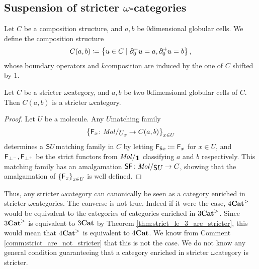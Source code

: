 \subsection{Suspension of stricter \texorpdfstring{$\omega$}{ω}-categories} \label{subsec:suspension}

\begin{dfn} 
    Let \( C \) be a composition structure, and \( a, b \) be \( 0 \)\nbd dimensional globular cells.
    We define the composition structure
    \begin{equation*}
        C(a, b) \coloneqq \left\{ {u \in C \mid \partial_{0}^{-} u = a, \partial_{0}^{+} u = b} \right\},    
    \end{equation*}
    whose boundary operators and \( k \)\nbd composition are induced by the one of \( C \) shifted by \( 1 \).
\end{dfn}

\begin{lem} \label{lem:hom_of_stricter_is_stricter}
    Let \( C \) be a stricter \( \omega \)\nbd category, and \( a, b \) be two \( 0 \)\nbd dimensional globular cells of \( C \).
    Then \( C(a, b) \) is a stricter \( \omega \)\nbd category.
\end{lem}
\begin{proof}
    Let \( U \) be a molecule.
    Any \( U \)\nbd matching family 
    \begin{equation*}
        \set{\F_x \colon \molecin{\imel{U}{x}} \to C(a, b)}_{x \in U}
    \end{equation*}
    determines a \( \mathsf{S}{U} \)\nbd matching family in \( C \) by letting \( \mathsf{F}_{\mathsf{S}{x}} \coloneqq \mathsf{F}_x \) for \( x \in U \), and \( \mathsf{F}_{\bot^-}, \mathsf{F}_{\bot^+} \) be the strict functors from \( \molecin{\pt} \) classifying \( a \) and \( b \) respectively. 
    This matching family has an amalgamation \( \sus{\F} \colon \molecin{\sus{U}} \to C \), showing that the amalgamation of \( \left\{ {\mathsf{F}_x} \right\}_{x \in U} \) is well defined.
\end{proof}

\begin{comm}
    Thus, any stricter \( \omega \)\nbd category can canonically be seen as a category enriched in stricter \( \omega \)\nbd categories.
    The converse is not true. 
    Indeed if it were the case, \( {4\mathbf{Cat}}^> \) would be equivalent to the categories of categories enriched in \( {3\mathbf{Cat}}^> \).
    Since \( {3\mathbf{Cat}}^> \) is equivalent to \( {3\mathbf{Cat}} \) by Theorem \ref{thm:strict_le_3_are_stricter}, this would mean that \( {4\mathbf{Cat}}^> \) is equivalent to \( {4\mathbf{Cat}} \).
    We know from Comment \ref{comm:strict_are_not_stricter} that this is not the case.
    We do not know any general condition guaranteeing that a category enriched in stricter \( \omega \)\nbd category is stricter.
\end{comm}

